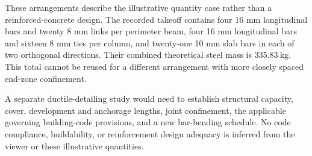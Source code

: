These arrangements describe the illustrative quantity case rather than a
reinforced-concrete design. The recorded takeoff contains four 16 mm
longitudinal bars and twenty 8 mm links per perimeter beam, four 16 mm
longitudinal bars and sixteen 8 mm ties per column, and twenty-one 10 mm
slab bars in each of two orthogonal directions. Their combined theoretical
steel mass is \(335.83~\mathrm{kg}\). This total cannot be reused for a
different arrangement with more closely spaced end-zone confinement.

A separate ductile-detailing study would need to establish structural
capacity, cover, development and anchorage lengths, joint confinement,
the applicable governing building-code provisions, and a new bar-bending
schedule. No code compliance, buildability, or reinforcement design
adequacy is inferred from the viewer or these illustrative quantities.
